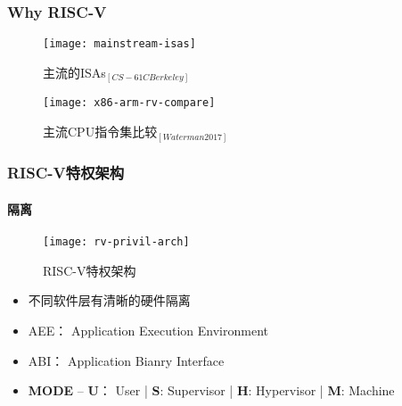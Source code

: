 \begin{frame}
	
	\frametitle{Why RISC-V}
	
	\begin{figure}
		\centering
		\texttt{[image: mainstream-isas]}
		\caption{主流的ISAs$ _{[CS-61C Berkeley]} $}
	\end{figure}
	
	\begin{figure}
		\centering
		\texttt{[image: x86-arm-rv-compare]}
		\caption{主流CPU指令集比较$ _{[Waterman 2017]} $}
	\end{figure}
	
	
	
	
\end{frame}

\begin{frame}
	\frametitle{RISC-V特权架构}
	\framesubtitle{隔离}
	
	\begin{figure}
	\centering
	\texttt{[image: rv-privil-arch]}
	\caption{RISC-V特权架构}
	\end{figure}

\begin{itemize}
	
	\item 不同软件层有清晰的硬件隔离
	\item AEE： Application Execution Environment
	\item ABI： Application Bianry Interface
	\item \textbf{MODE} -- \textbf{U}： User | \textbf{S}: Supervisor | \textbf{H}: Hypervisor | \textbf{M}: Machine

\end{itemize}

\end{frame}

